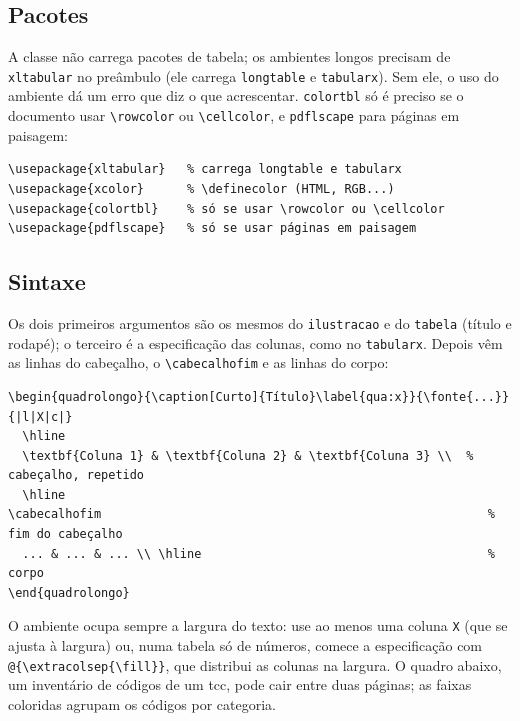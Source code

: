 \subsection{Pacotes}

A classe não carrega pacotes de tabela; os ambientes longos precisam
de \texttt{xltabular} no preâmbulo (ele carrega \texttt{longtable} e \texttt{tabularx}).
Sem ele, o uso do ambiente dá um erro que diz o que acrescentar. \texttt{colortbl} só é
preciso se o documento usar \texttt{\textbackslash rowcolor} ou
\texttt{\textbackslash cellcolor}, e \texttt{pdflscape} para páginas em paisagem:
\begin{lstlisting}[style=exemplo, language={[LaTeX]TeX}]
\usepackage{xltabular}   % carrega longtable e tabularx
\usepackage{xcolor}      % \definecolor (HTML, RGB...)
\usepackage{colortbl}    % só se usar \rowcolor ou \cellcolor
\usepackage{pdflscape}   % só se usar páginas em paisagem
\end{lstlisting}

\subsection{Sintaxe}

Os dois primeiros argumentos são os mesmos do \texttt{ilustracao} e do
\texttt{tabela} (título e rodapé); o terceiro é a especificação das colunas, como no
\texttt{tabularx}. Depois vêm as linhas do cabeçalho, o \texttt{\textbackslash cabecalhofim}
e as linhas do corpo:
\begin{lstlisting}[style=exemplo, language={[LaTeX]TeX}]
\begin{quadrolongo}{\caption[Curto]{Título}\label{qua:x}}{\fonte{...}}{|l|X|c|}
  \hline
  \textbf{Coluna 1} & \textbf{Coluna 2} & \textbf{Coluna 3} \\  % cabeçalho, repetido
  \hline
\cabecalhofim                                                      % fim do cabeçalho
  ... & ... & ... \\ \hline                                        % corpo
\end{quadrolongo}
\end{lstlisting}
O ambiente ocupa sempre a largura do texto: use ao menos uma coluna \texttt{X} (que se ajusta
à largura) ou, numa tabela só de números, comece a especificação com
\texttt{@\{\textbackslash extracolsep\{\textbackslash fill\}\}}, que distribui as colunas na
largura. O quadro abaixo, um inventário de códigos de um \ac{tcc}, pode cair entre duas
páginas; as faixas coloridas agrupam os códigos por categoria.

